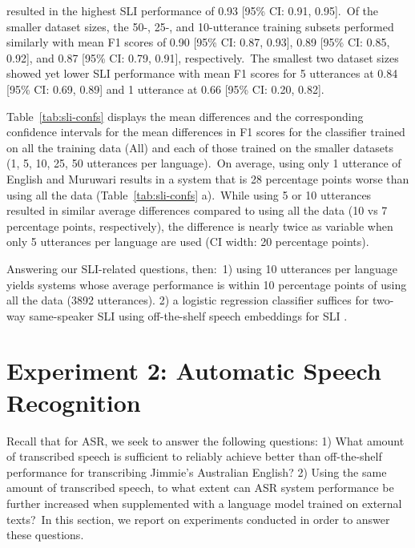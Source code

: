 \documentclass[main.tex]{subfiles}
\begin{document}
\noindent{}resulted in the highest SLI performance of 0.93 [95\% CI: 0.91, 0.95].~Of the smaller dataset sizes, the 50-, 25-, and 10-utterance training subsets performed similarly with mean F1 scores of 0.90 [95\% CI: 0.87, 0.93], 0.89 [95\% CI: 0.85, 0.92], and 0.87 [95\% CI: 0.79, 0.91], respectively.~The smallest two dataset sizes showed yet lower SLI performance with mean F1 scores for 5 utterances at 0.84 [95\% CI: 0.69, 0.89] and 1 utterance at 0.66 [95\% CI: 0.20, 0.82].

Table~\ref{tab:sli-confs} displays the mean differences and the corresponding confidence intervals for the mean differences in F1 scores for the classifier trained on all the training data (All) and each of those trained on the smaller datasets (1, 5, 10, 25, 50 utterances per language).~On average, using only 1 utterance of English and Muruwari results in a system that is 28 percentage points worse than using all the data (Table~\ref{tab:sli-confs} a).~While using 5 or 10 utterances resulted in similar average differences compared to using all the data (10 vs 7 percentage points, respectively), the difference is nearly twice as variable when only 5 utterances per language are used (CI width: 20 percentage points). 

Answering our SLI-related questions, then:~1) using 10 utterances per language yields systems whose average performance is within 10 percentage points of using all the data (3892 utterances). 2) a logistic regression classifier suffices for two-way same-speaker SLI using off-the-shelf speech embeddings for SLI \parencite[][]{ravanelli2021speechbrain}.

\section{Experiment 2: Automatic Speech Recognition}
\label{sec:computel5-asr}

Recall that for ASR, we seek to answer the following questions: 1) What amount of transcribed speech is sufficient to reliably achieve better than off-the-shelf performance for transcribing Jimmie's Australian English? 2) Using the same amount of transcribed speech, to what extent can ASR system performance be further increased when supplemented with a language model trained on external texts?~In this section, we report on experiments conducted in order to answer these questions.
\end{document}
